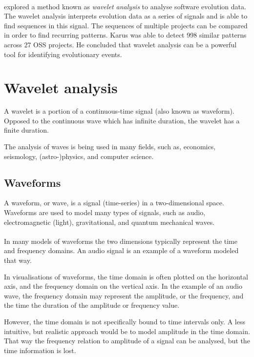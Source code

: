 \paragraph{}
\citet{karus2013} explored a method known as \emph{wavelet analysis }\rm to
analyse software evolution data. The wavelet analysis interprets evolution data
as a series of signals and is able to find sequences in this signal. The
sequences of multiple projects can be compared in order to find recurring
patterns. Karus was able to detect 998 similar patterns across 27 OSS projects.
He concluded that wavelet analysis can be a powerful tool for identifying
evolutionary events.





\section{Wavelet analysis}
\label{wavelet_analysis}
A wavelet is a portion of a continuous-time signal (also known as waveform).
Opposed to the continuous wave which has infinite duration, the wavelet has a
finite duration.

The analysis of waves is being used in many fields, such as, economics,
seismology, (astro-)physics, and computer science.

\subsection{Waveforms}
A waveform, or wave, is a signal (time-series) in a two-dimensional space.
Waveforms are used to model many types of signals, such as audio,
electromagnetic (light), gravitational, and quantum mechanical waves.

\paragraph{}
In many models of waveforms the two dimensions typically represent the time and
frequency domains. An audio signal is an example of a waveform modeled that way.

In visualisations of waveforms, the time domain is often plotted on the
horizontal axis, and the frequency domain on the vertical axis. In the example
of an audio wave, the frequency domain may represent the amplitude, or the
frequency, and the time the duration of the amplitude or frequency value.

However, the time domain is not specifically bound to time intervals only. A
less intuitive, but realistic approach would be to model amplitude in the time
domain. That way the frequency relation to amplitude of a signal can be
analysed, but the time information is lost.

